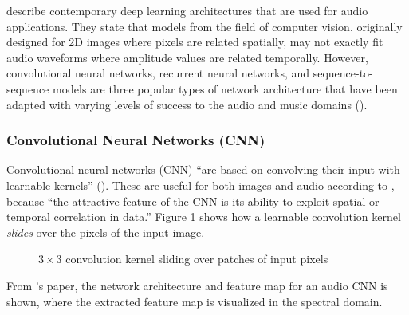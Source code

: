\documentclass[report.tex]{subfiles}
\begin{document}
\textcite{audiodeeplearning} describe contemporary deep learning architectures that are used for audio applications. They state that models from the field of computer vision, originally designed for 2D images where pixels are related spatially, may not exactly fit audio waveforms where amplitude values are related temporally. However, convolutional neural networks, recurrent neural networks, and sequence-to-sequence models are three popular types of network architecture that have been adapted with varying levels of success to the audio and music domains (\cite{audiodeeplearning}).

\newpagefill

\subsubsection{Convolutional Neural Networks (CNN)}

Convolutional neural networks (CNN) ``are based on convolving their input with learnable kernels'' (\cite{audiodeeplearning}). These are useful for both images and audio according to \textcite{cnns}, because ``the attractive feature of the CNN is its ability to exploit spatial or temporal correlation in data.'' Figure \ref{fig:cnnbasic} shows how a learnable convolution kernel \textit{slides} over the pixels of the input image.

\begin{figure}[ht]
	\centering
	\hspace{0.15em}
	\caption{$3 \times 3$ convolution kernel sliding over patches of input pixels}
	\label{fig:cnnbasic}
\end{figure}

From \textcite{audiocnn2}'s paper, the network architecture and feature map for an audio CNN is shown, where the extracted feature map is visualized in the spectral domain.
\end{document}
